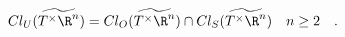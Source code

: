 \begin{equation}
Cl_U (\widetilde{T^\times \R^n}) = Cl_O (
	\widetilde{T^\times \R^n}) \cap
		Cl_S (\widetilde{T^\times \R^n}) \quad n\ge 2 \quad.
\label{eq:cluphasespace}
\end{equation}

